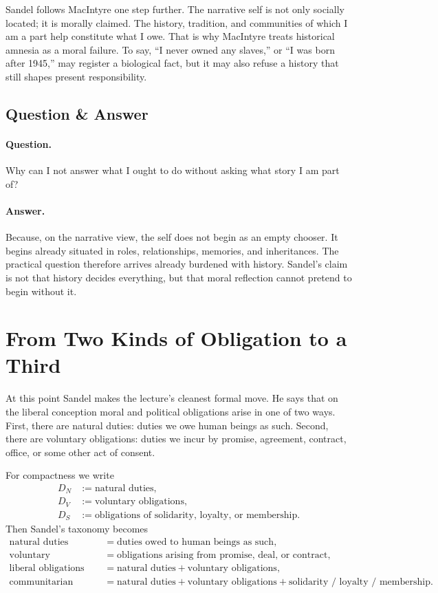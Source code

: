 Sandel follows MacIntyre one step further. The narrative self is not only socially located; it is morally claimed. The history, tradition, and communities of which I am a part help constitute what I owe. That is why MacIntyre treats historical amnesia as a moral failure. To say, ``I never owned any slaves,'' or ``I was born after 1945,'' may register a biological fact, but it may also refuse a history that still shapes present responsibility.

\subsection{Question \& Answer}

\paragraph{Question.} Why can I not answer what I ought to do without asking what story I am part of?

\paragraph{Answer.} Because, on the narrative view, the self does not begin as an empty chooser. It begins already situated in roles, relationships, memories, and inheritances. The practical question therefore arrives already burdened with history. Sandel's claim is not that history decides everything, but that moral reflection cannot pretend to begin without it.

\section{From Two Kinds of Obligation to a Third}

At this point Sandel makes the lecture's cleanest formal move. He says that on the liberal conception moral and political obligations arise in one of two ways. First, there are natural duties: duties we owe human beings as such. Second, there are voluntary obligations: duties we incur by promise, agreement, contract, office, or some other act of consent.

For compactness we write
\begin{align}
D_N &:= \text{natural duties}, \\
D_V &:= \text{voluntary obligations}, \\
D_S &:= \text{obligations of solidarity, loyalty, or membership}.
\end{align}
Then Sandel's taxonomy becomes
\begin{align}
\text{natural duties} &= \text{duties owed to human beings as such}, \\
\text{voluntary obligations} &= \text{obligations arising from promise, deal, or contract}, \\
\text{liberal obligations} &= \text{natural duties}+\text{voluntary obligations}, \\
\text{communitarian obligations} &= \text{natural duties}+\text{voluntary obligations}+\text{solidarity / loyalty / membership}.
\end{align}

